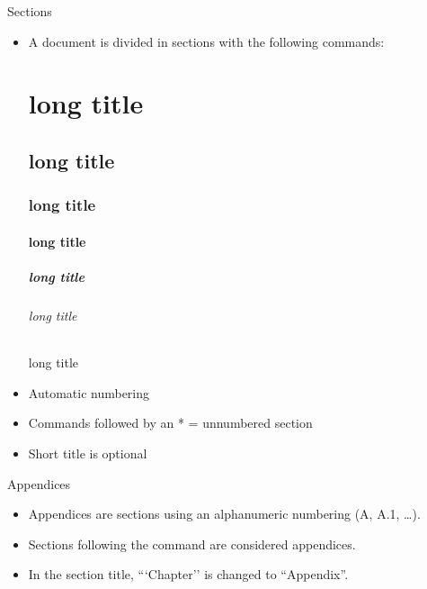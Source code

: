 \begin{frame}[fragile]{Sections}
	\begin{itemize}
		\item A document is divided in sections with the following commands:
\begin{codesource}
	\part[short title]{long title}
	\chapter[short title]{long title}
	\section[short title]{long title}
	\subsection[short title]{long title}
	
	\subsubsection[short title]{long title} 	%
	
	\paragraph[short title]{long title} 		%
	\subparagraph[short title]{long title} 	%
\end{codesource}

		\item Automatic numbering
		\item Commands followed by an * = unnumbered section
		\item Short title is optional
	\end{itemize}
\end{frame}

\begin{frame}[fragile,c]{Appendices}
	\begin{itemize}
		\item Appendices are sections using an alphanumeric numbering (A,
			A.1, \ldots).
		\item Sections following the  command are considered appendices.
		\item In the section title, ```Chapter'' is changed to ``Appendix''.
	\end{itemize}
\end{frame}

